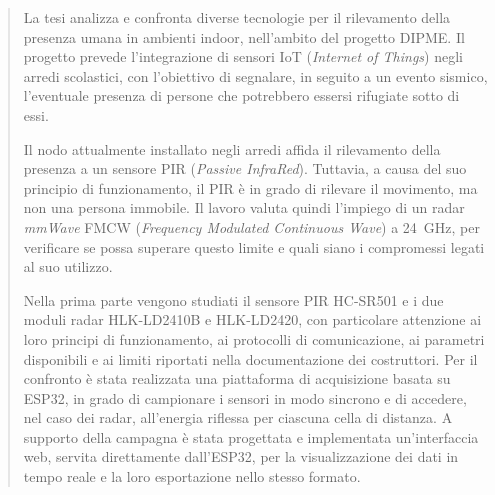 %
\begin{abstract}

La tesi analizza e confronta diverse tecnologie per il rilevamento della presenza
umana in ambienti indoor, nell'ambito del progetto DIPME. Il
progetto prevede l'integrazione di sensori IoT (\emph{Internet of Things}) negli
arredi scolastici, con l'obiettivo di segnalare, in seguito a un evento sismico,
l'eventuale presenza di persone che potrebbero essersi rifugiate sotto di essi.

Il nodo attualmente installato negli arredi affida il rilevamento della presenza a
un sensore PIR (\emph{Passive InfraRed}). Tuttavia, a causa del suo principio di
funzionamento, il PIR è in grado di rilevare il movimento, ma non una persona
immobile. Il lavoro valuta quindi l'impiego di un radar \emph{mmWave} FMCW
(\emph{Frequency Modulated Continuous Wave}) a 24~GHz, per verificare se possa
superare questo limite e quali siano i compromessi legati al suo utilizzo.

Nella prima parte vengono studiati il sensore PIR HC-SR501 e i due moduli radar
HLK-LD2410B e HLK-LD2420, con particolare attenzione ai loro principi di
funzionamento, ai protocolli di comunicazione, ai parametri disponibili e ai limiti
riportati nella documentazione dei costruttori. Per il confronto è stata realizzata
una piattaforma di acquisizione basata su ESP32, in grado di campionare i sensori
in modo sincrono e di accedere, nel caso dei radar, all'energia riflessa per
ciascuna cella di distanza. A supporto della campagna è stata progettata e
implementata un'interfaccia web, servita direttamente dall'ESP32, per la
visualizzazione dei dati in tempo reale e la loro esportazione nello stesso formato.


\end{abstract}
